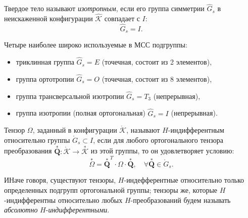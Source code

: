 
\begin{definition*}
	Твердое тело называют \textit{изотропным}, если его группа симметрии $\hat{G}_s$ в неискаженной конфигурации $\hat{\mathcal{K}}$ совпадает с $I$:
	\begin{equation*}
		\hat{G}_s = I.
	\end{equation*}
\end{definition*}

Четыре наиболее широко используемые в МСС подгруппы:
\begin{itemize}
	\item триклинная группа $\hat{G}_s = E$ (точечная, состоит из 2 элементов), 
	
	\item группа ортотропии $\hat{G}_s = O$ (точечная, состоит из 8 элементов), 
	
	\item группа трансверсальной изотропии $\hat{G}_s = T_3$ (непрерывная),
	
	\item группа изотропии (полная ортогональная) $\hat{G}_s = I$ (непрерывная). 
\end{itemize}

\begin{definition*}
	Тензор $\Omega$, заданный в конфигурации $\mathring{\mathcal{K}}$, называют $H$-индифферентным относительно группы $\mathring{G}_s \subset I$, если для любого ортогонального тензора преобразования $\overset{\ast}{\mathbf{Q}} : \mathring{\mathcal{K}} \to \overset{\ast}{\mathcal{K}}$ из этой группы, то он удовлетворяет условию:
	\begin{equation*}
		\overset{\ast}{\Omega} = \overset{\ast}{\mathbf{Q}}^{T} \cdot \Omega \cdot \overset{\ast}{\mathbf{Q}}, \quad \forall \overset{\ast}{\mathbf{Q}} \in \mathring{G}_s.
	\end{equation*}
	
	ИНаче говоря, существуют тензоры, $H$-индефферентные относительно только определенных подгрупп ортогональной группы; тензоры же, которые $H$-индифферентны относительно любых $H$-преобразований будем называть \textit{абсолютно} $H$-\textit{индифферентными}.
\end{definition*}